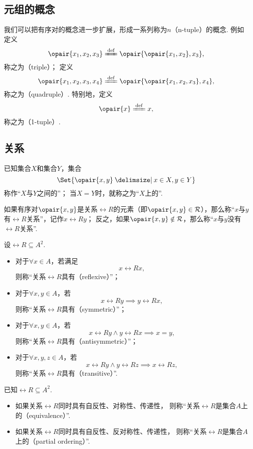 \subsection{元组的概念}
我们可以把有序对的概念进一步扩展，形成一系列称为\(n\)（n-tuple）的概念.
例如定义\[
\opair{x_1,x_2,x_3}
\defeq
\opair{\opair{x_1,x_2},x_3},
\]称之为（triple）；
定义\[
\opair{x_1,x_2,x_3,x_4}
\defeq
\opair{\opair{x_1,x_2,x_3},x_4},
\]称之为（quadruple）.
特别地，定义\[
\opair{x}
\defeq
x,
\]称之为（1-tuple）.

\subsection{关系}
\begin{definition}
已知集合\(X\)和集合\(Y\)，集合\[
\Set{ \opair{x,y} \given x \in X, y \in Y }
\]称作“\(X\)与\(Y\)之间的”；
当\(X = Y\)时，就称之为“\(X\)上的”.

如果有序对\(\opair{x,y}\)是关系\(\rel{R}\)的元素（即\(\opair{x,y} \in \rel{R}\)），那么称“\(x\)与\(y\)有\(\rel{R}\)关系”，记作\(x\rel{R}y\)；
反之，如果\(\opair{x,y} \notin \rel{R}\)，那么称“\(x\)与\(y\)没有\(\rel{R}\)关系”.
\end{definition}

\begin{definition}
设\(\rel{R} \subseteq A^2\).
\begin{itemize}
	\item 对于\(\forall x \in A\)，若满足\[
		x\rel{R}x,
	\]
	则称“关系\(\rel{R}\)具有（reflexive）”；

	\item 对于\(\forall x,y \in A\)，若\[
		x\rel{R}y \implies y\rel{R}x,
	\]
	则称“关系\(\rel{R}\)具有（symmetric）”；

	\item 对于\(\forall x,y \in A\)，若\[
		x\rel{R}y \land y\rel{R}x \implies x = y,
	\]
	则称“关系\(\rel{R}\)具有（antisymmetric）”；

	\item 对于\(\forall x,y,z \in A\)，若\[
		x\rel{R}y \land y\rel{R}z \implies x\rel{R}z,
	\]
	则称“关系\(\rel{R}\)具有（transitive）”.
\end{itemize}
\end{definition}

\begin{definition}
已知\(\rel{R} \subseteq A^2\).
\begin{itemize}
	\item 如果关系\(\rel{R}\)同时具有自反性、对称性、传递性，
	则称“关系\(\rel{R}\)是集合\(A\)上的（equivalence）”.

	\item 如果关系\(\rel{R}\)同时具有自反性、反对称性、传递性，
	则称“关系\(\rel{R}\)是集合\(A\)上的（partial ordering）”.
\end{itemize}
\end{definition}

